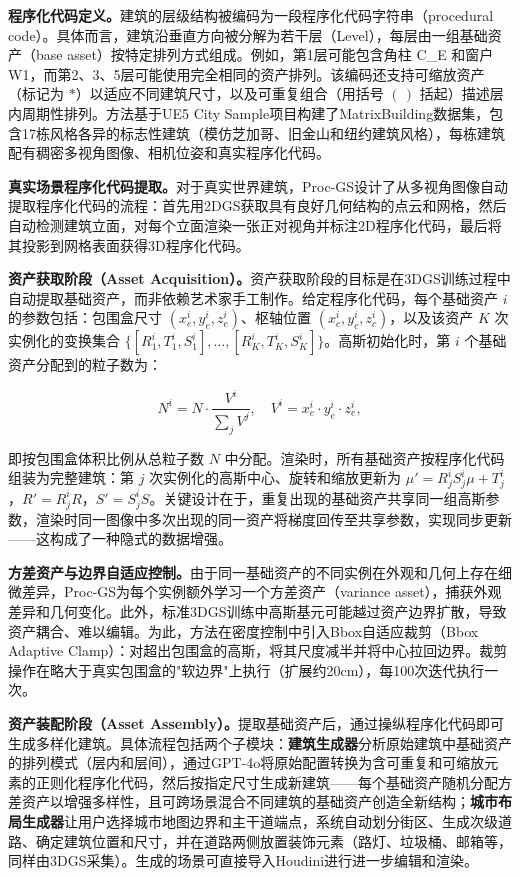 \textbf{程序化代码定义。}建筑的层级结构被编码为一段程序化代码字符串（procedural code）。具体而言，建筑沿垂直方向被分解为若干层（Level），每层由一组基础资产（base asset）按特定排列方式组成。例如，第1层可能包含角柱 C\_E 和窗户 W1，而第2、3、5层可能使用完全相同的资产排列。该编码还支持可缩放资产（标记为 $*$）以适应不同建筑尺寸，以及可重复组合（用括号 $(\,)$ 括起）描述层内周期性排列。方法基于UE5 City Sample项目构建了MatrixBuilding数据集，包含17栋风格各异的标志性建筑（模仿芝加哥、旧金山和纽约建筑风格），每栋建筑配有稠密多视角图像、相机位姿和真实程序化代码。

\textbf{真实场景程序化代码提取。}对于真实世界建筑，Proc-GS设计了从多视角图像自动提取程序化代码的流程：首先用2DGS获取具有良好几何结构的点云和网格，然后自动检测建筑立面，对每个立面渲染一张正对视角并标注2D程序化代码，最后将其投影到网格表面获得3D程序化代码。

\textbf{资产获取阶段（Asset Acquisition）。}资产获取阶段的目标是在3DGS训练过程中自动提取基础资产，而非依赖艺术家手工制作。给定程序化代码，每个基础资产 $i$ 的参数包括：包围盒尺寸 $(x_e^i, y_e^i, z_e^i)$、枢轴位置 $(x_c^i, y_c^i, z_c^i)$，以及该资产 $K$ 次实例化的变换集合 $\{[R_1^i, T_1^i, S_1^i], \ldots, [R_K^i, T_K^i, S_K^i]\}$。高斯初始化时，第 $i$ 个基础资产分配到的粒子数为：

\begin{equation}
N^i = N \cdot \frac{V^i}{\sum_j V^j}, \quad V^i = x_e^i \cdot y_e^i \cdot z_e^i,
\end{equation}

即按包围盒体积比例从总粒子数 $N$ 中分配。渲染时，所有基础资产按程序化代码组装为完整建筑：第 $j$ 次实例化的高斯中心、旋转和缩放更新为 $\mu' = R_j^i S_j^i \mu + T_j^i$，$R' = R_j^i R$，$S' = S_j^i S$。关键设计在于，重复出现的基础资产共享同一组高斯参数，渲染时同一图像中多次出现的同一资产将梯度回传至共享参数，实现同步更新——这构成了一种隐式的数据增强。

\textbf{方差资产与边界自适应控制。}由于同一基础资产的不同实例在外观和几何上存在细微差异，Proc-GS为每个实例额外学习一个方差资产（variance asset），捕获外观差异和几何变化。此外，标准3DGS训练中高斯基元可能越过资产边界扩散，导致资产耦合、难以编辑。为此，方法在密度控制中引入Bbox自适应裁剪（Bbox Adaptive Clamp）：对超出包围盒的高斯，将其尺度减半并将中心拉回边界。裁剪操作在略大于真实包围盒的"软边界"上执行（扩展约20cm），每100次迭代执行一次。

\textbf{资产装配阶段（Asset Assembly）。}提取基础资产后，通过操纵程序化代码即可生成多样化建筑。具体流程包括两个子模块：\textbf{建筑生成器}分析原始建筑中基础资产的排列模式（层内和层间），通过GPT-4o将原始配置转换为含可重复和可缩放元素的正则化程序化代码，然后按指定尺寸生成新建筑——每个基础资产随机分配方差资产以增强多样性，且可跨场景混合不同建筑的基础资产创造全新结构；\textbf{城市布局生成器}让用户选择城市地图边界和主干道端点，系统自动划分街区、生成次级道路、确定建筑位置和尺寸，并在道路两侧放置装饰元素（路灯、垃圾桶、邮箱等，同样由3DGS采集）。生成的场景可直接导入Houdini进行进一步编辑和渲染。

